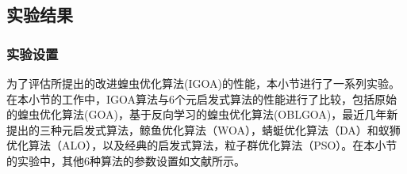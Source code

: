 \subsection{实验结果}
\subsubsection{实验设置}

为了评估所提出的改进蝗虫优化算法(IGOA)的性能，本小节进行了一系列实验。在本小节的工作中，IGOA算法与6个元启发式算法的性能进行了比较，包括原始的蝗虫优化算法(GOA)，基于反向学习的蝗虫优化算法(OBLGOA)，最近几年新提出的三种元启发式算法，鲸鱼优化算法（WOA），蜻蜓优化算法（DA）和蚁狮优化算法（ALO），以及经典的启发式算法，粒子群优化算法（PSO）。在本小节的实验中，其他6种算法的参数设置如文献\cite{saremi2017grasshopper,ewees2018improved,mirjalili2016whale,mirjalili2016dragonfly,mirjalili2015ant,kennedy1995particle}所示。

